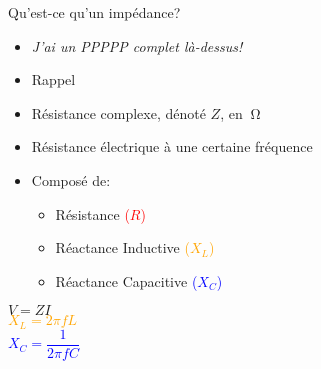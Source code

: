 \begin{frame}{Qu'est-ce qu'un impédance?}
    \begin{twocolumns}
        \leftcol
        \begin{itemize}
            \item \textit{J'ai un PPPPP complet là-dessus!}
            \item Rappel
            \bigskip
            \item Résistance complexe, dénoté $Z$, en $\SI{}{\ohm}$
            \item Résistance électrique à une certaine fréquence
            \item Composé de:
            \begin{itemize}
                \item Résistance \textcolor{red}{($R$)}
                \item Réactance Inductive \textcolor{orange}{($X_L$)}
                \item Réactance Capacitive \textcolor{blue}{($X_C$)}
            \end{itemize}
        \end{itemize}

        \rightcol
        \begin{center}
            \Large
            $V = ZI$\\
            \vspace{12pt}
            \textcolor{orange}{
                $X_L = 2\pi f L$\\
            }
            \vspace{12pt}
            \textcolor{blue}{
                $X_C = \dfrac{1}{2\pi f C}$
            }
        \end{center}
    \end{twocolumns}
\end{frame}

